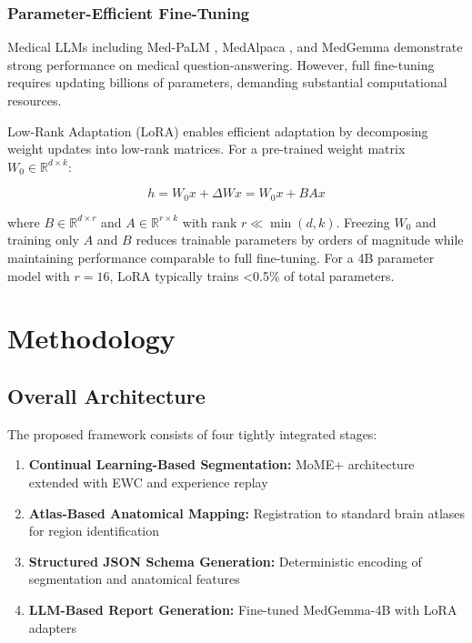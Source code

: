 \documentclass[conference]{IEEEtran}
\begin{document}
\subsubsection{Parameter-Efficient Fine-Tuning}

Medical LLMs including Med-PaLM \cite{singhal2023medpalm}, MedAlpaca \cite{han2023medalp}, and MedGemma \cite{medgemma2024}demonstrate strong performance on medical question-answering. However, full fine-tuning requires updating billions of parameters, demanding substantial computational resources.

Low-Rank Adaptation (LoRA) \cite{hu2022lora} enables efficient adaptation by decomposing weight updates into low-rank matrices. For a pre-trained weight matrix $W_0 \in \mathbb{R}^{d \times k}$:

\begin{equation}
h = W_0 x + \Delta W x = W_0 x + BA x
\end{equation}

where $B \in \mathbb{R}^{d \times r}$ and $A \in \mathbb{R}^{r \times k}$ with rank $r \ll \min(d, k)$. Freezing $W_0$ and training only $A$ and $B$ reduces trainable parameters by orders of magnitude while maintaining performance comparable to full fine-tuning. For a 4B parameter model with $r=16$, LoRA typically trains <0.5\% of total parameters.

\section{Methodology}

\subsection{Overall Architecture}

The proposed framework consists of four tightly integrated stages:

\begin{enumerate}
\item \textbf{Continual Learning-Based Segmentation:} MoME+ architecture extended with EWC and experience replay
\item \textbf{Atlas-Based Anatomical Mapping:} Registration to standard brain atlases for region identification
\item \textbf{Structured JSON Schema Generation:} Deterministic encoding of segmentation and anatomical features
\item \textbf{LLM-Based Report Generation:} Fine-tuned MedGemma-4B with LoRA adapters
\end{enumerate}
\end{document}
